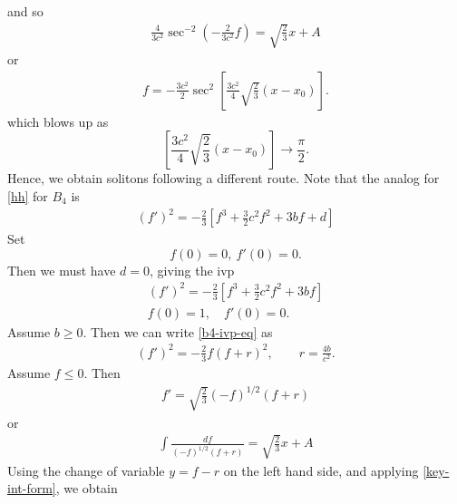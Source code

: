 \documentclass[12pt,reqno]{amsart}
\numberwithin{equation}{section}  %
\begin{document}
%
%
and so
%
%
\begin{equation*}
\begin{split}
 \frac{4}{3c^{2}} \sec^{-2}\left (-\frac{2}{3c^{2}}f \right )
= \sqrt{\frac{2}{3}}
x + A
\end{split}
\end{equation*}
%
or
%
%
\begin{equation*}
\begin{split}
  f = -\frac{3c^{2}}{2} \sec^{2}\left[ \frac{3c^{2}}{4} \sqrt{\frac{2}{3}} \left (x
  - x_{0} \right)\right].
\end{split}
\end{equation*}
%
%
which blows up as $$ \left[ \frac{3c^{2}}{4} \sqrt{\frac{2}{3}} (x-x_{0})
\right] \to \frac{\pi}{2}.$$
%
%
Hence, we obtain solitons following a different route. Note that the analog for 
\eqref{hh} for $B_{4}$ is
\begin{equation}
  \label{hhb4}
\begin{split}
  (f')^{2} = -\frac{2}{3} \left [ f^{3} + \frac{3}{2}c^{2}f^{2} + 3bf +d \right ]
\end{split}
\end{equation}
Set $$f(0) = 0, \ f'(0) = 0.$$ Then we must have $d=0$, giving 
the ivp
%
%
\begin{gather}
  (f')^{2} = -\frac{2}{3}\left [ f^{3} + \frac{3}{2}c^{2}f^{2} + 3bf \right ]
  \label{b4-ivp-eq}
  \\
  f(0)=1, \quad f'(0) = 0.
\end{gather}
%
Assume $b \ge 0$. Then we can write \eqref{b4-ivp-eq} as
%
%
\begin{equation*}
\begin{split}
  (f')^{2} = -\frac{2}{3}f (f + r)^{2}, \qquad r = \frac{4b}{c^{2}}.
\end{split}
\end{equation*}
%
%
Assume $f \le 0$. Then
%
%
\begin{equation*}
\begin{split}
  f' = \sqrt{\frac{2}{3}} (-f)^{1/2}(f+r)
\end{split}
\end{equation*}
%
%
or
%
%
\begin{equation*}
\begin{split}
  \int \frac{df}{(-f)^{1/2}(f+r)} =  \sqrt{\frac{2}{3}} x + A
\end{split}
\end{equation*}
%
%
Using the change of variable $y = f-r$ on the left hand side, and applying
\eqref{key-int-form}, we obtain
%
\end{document}
